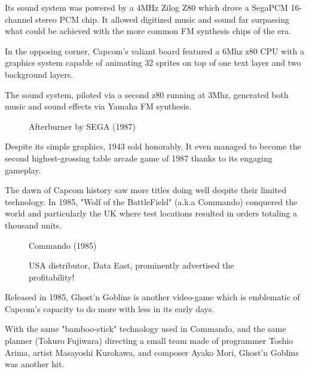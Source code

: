 
Its sound system was powered by a 4MHz Zilog Z80 which drove a SegaPCM 16-channel stereo PCM chip. It allowed digitized music and sound far surpassing what could be achieved with the more common FM synthesis chips of the era.

In the opposing corner, Capcom's valiant board featured a 6Mhz z80 CPU with a graphics system capable of animating 32 sprites on top of one text layer and two background layers\cite{1942-tech_specs}. 

The sound system, piloted via a second z80 running at 3Mhz, generated both music and sound effects via Yamaha FM synthesis.




\begin{figure}[H]
\caption*{Afterburner by SEGA (1987)}
\end{figure}

Despite its simple graphics, 1943 sold honorably. It even managed to become the second highest-grossing table arcade game of 1987 thanks to its engaging gameplay. 

The dawn of Capcom history saw more titles doing well despite their limited technology. In 1985, "Wolf of the BattleField" (a.k.a Commando) conquered the world and particularly the UK where test locations resulted in orders totaling a thousand units\cite{cgm4}.

\begin{figure}[H]
\caption*{Commando (1985)}
\end{figure}


\vfill

\begin{figure}[!b]
\caption*{USA distributor, Data East, prominently advertised the profitability!}
\end{figure}
\pagebreak


Released in 1985, Ghost'n Goblins is another video-game which is emblematic of Capcom's capacity to do more with less in its early days. 

With the same "bamboo-stick" technology used in Commando, and the same planner (Tokuro Fujiwara) directing a small team made of programmer Toshio Arima, artist Masayoshi Kurokawa, and composer Ayako Mori, Ghost'n Goblins was another hit.

